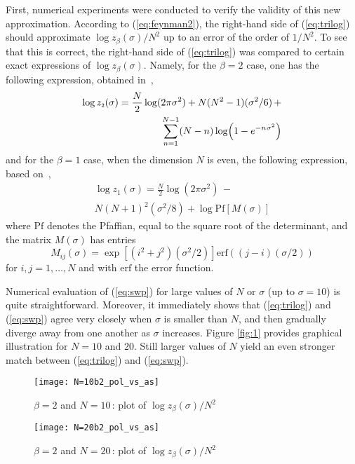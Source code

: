 \documentclass[draftclsnofoot]{IEEEtran}
\begin{document}
First, numerical experiments were conducted to verify the validity of this new approximation. According to (\ref{eq:feynman2}), the right-hand side of (\ref{eq:trilog}) should approximate $\log z_\beta(\sigma)/N^2$ up to an error of the order of $1/N^2$. To see that this is correct, the right-hand side of (\ref{eq:trilog}) was compared to certain exact expressions of $\log z_\beta(\sigma)$. Namely, for the $\beta = 2$ case, one has the following expression, obtained in~\cite{habilitation}, 
\begin{align} \label{eq:swp}
\nonumber \log z_{\scriptscriptstyle 2}(\sigma) = \frac{N}{2} \log( 2\pi\sigma^2) + N(N^2 - 1)(\sigma^{2}/6) \,+ \\ \sum^{N-1}_{n=1}(N-n)\log\!\left(1 - e^{-n\hspace{0.02cm}\sigma^2}\right)
\end{align}
and for the $\beta = 1$ case, when the dimension $N$ is even, the following expression, based on~\cite{Ti20},
\begin{align} \label{eq:pfaff}
\nonumber \log z_{\scriptscriptstyle 1}(\sigma) = 
\frac{N}{2} \log( 2\pi\sigma^2) \,- \\ N(N+1)^2(\sigma^2/8) +  \log\mathrm{Pf}\left[M(\sigma)\right]
\end{align}
where $\mathrm{Pf}$ denotes the Pfaffian, equal to the square root of the determinant, and the matrix $M(\sigma)$ has entries
\begin{equation} \label{eq:MB1}
  M_{ij}(\sigma) = \exp\left[(i^2+j^2)(\sigma^2/2)\right]\mathrm{erf}((j-i)(\sigma/2))  
\end{equation}
for $i,j=1,\ldots,N$ and with $\mathrm{erf}$ the error function.

Numerical evaluation of (\ref{eq:swp}) for large values of $N$ or $\sigma$ (up to $\sigma = 10$) is quite straightforward. Moreover, it immediately shows that (\ref{eq:trilog}) and (\ref{eq:swp}) agree very closely when $\sigma$ is smaller than $N$, and then gradually diverge away from one another as $\sigma$ increases. Figure \ref{fig:1} provides graphical illustration for $N = 10$ and $20$. Still larger values of $N$ yield an even stronger match between (\ref{eq:trilog}) and (\ref{eq:swp}).

\begin{figure*}[t]
    \centering
    \begin{subfigure}[b]{0.475\textwidth}
        \centering
        \texttt{[image: N=10b2\_pol\_vs\_as]}
        \caption{$\beta = 2$ and $N = 10$\,: plot of $\log z_\beta(\sigma)/N^2$}
    \end{subfigure}
    \quad
    \begin{subfigure}[b]{0.475\textwidth}  
        \centering 
        \texttt{[image: N=20b2\_pol\_vs\_as]}
        \caption{$\beta = 2$ and $N = 20$\,: plot of $\log z_\beta(\sigma)/N^2$}
    \end{subfigure}
    \caption{Proposition \ref{prop:trilog} ($\beta = 2$)\,: (\ref{eq:trilog}) in dashed red and (\ref{eq:swp}) in solid blue}
\label{fig:1}
\end{figure*}
\end{document}
